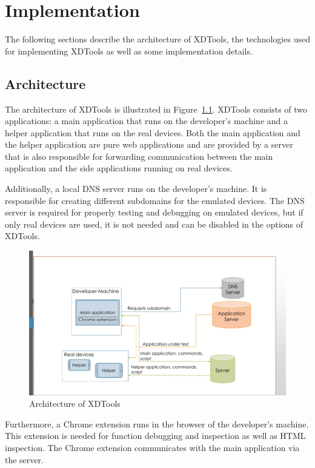 \chapter{Implementation}

The following sections describe the architecture of XDTools, the technologies used for implementing XDTools as well as some implementation details.

\section{Architecture}

The architecture of XDTools is illustrated in Figure~\ref{fig:architecture}. XDTools consists of two applications: a main application that runs on the developer's machine and a helper application that runs on the real devices. Both the main application and the helper application are pure web applications and are provided by a server that is also responsible for forwarding communication between the main application and the side applications running on real devices.

Additionally, a local DNS server runs on the developer's machine. It is responsible for creating different subdomains for the emulated devices. The DNS server is required for properly testing and debugging on emulated devices, but if only real devices are used, it is not needed and can be disabled in the options of XDTools.

\begin{figure}[H]
  \centering
    \includegraphics[width=1.0\textwidth]{images/architecture_2.pdf}
	\caption[Architecture of XDTools]{Architecture of XDTools}
	\label{fig:architecture}
\end{figure}

Furthermore, a Chrome extension runs in the browser of the developer's machine. This extension is needed for function debugging and inspection as well as HTML inspection. The Chrome extension communicates with the main application via the server.

